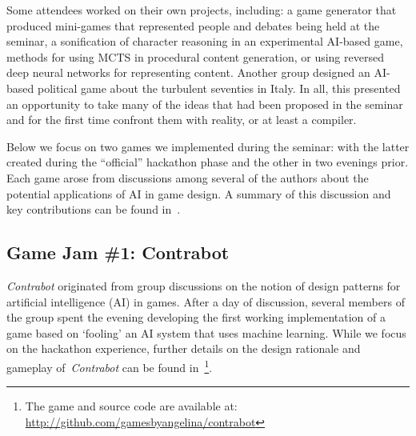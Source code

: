 \documentclass{acm_proc_article-sp}
\newcommand{\mytodo}[1]{\textbf{[[#1]]}}
\begin{document}


Some attendees worked on their own projects, including: a game generator that produced mini-games that represented people and debates being held at the seminar, a sonification of character reasoning in an experimental AI-based game, methods for using MCTS in procedural content generation, or using reversed deep neural networks for representing content.
Another group designed an AI-based political game about the turbulent seventies in Italy.
In all, this presented an opportunity to take many of the ideas that had been proposed in the seminar and for the first time confront them with reality, or at least a compiler.







Below we focus on two games we implemented during the seminar: with the latter created during the ``official'' hackathon phase and the other in two evenings prior.
Each game arose from discussions among several of the authors about the potential applications of AI in game design. A summary of this discussion and key contributions can be found in~\cite{treanor2015:ai-based-game}.


\subsection{Game Jam \#1: Contrabot}
\textit{Contrabot} originated from group discussions on the notion of design patterns for artificial intelligence (AI) in games.
After a day of discussion, several members of the group spent the evening developing the first working implementation of a game based on `fooling' an AI system that uses machine learning.
While we focus on the hackathon experience, further details on the design rationale and gameplay of~\textit{Contrabot} can be found in~\cite{treanor2015:ai-based-game}\footnote{The game and source code are available at: \url{http://github.com/gamesbyangelina/contrabot}}.
\end{document}
